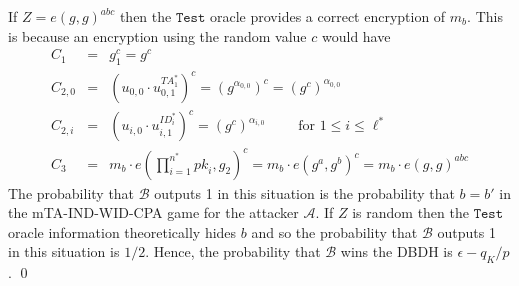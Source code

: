 \documentclass[10pt]{llncs}
\newcommand{\A}{\mathcal{A}}
\newcommand{\B}{\mathcal{B}}
\newcommand{\ID}{\mathit{ID}}
\newcommand{\TA}{\mathit{TA}}
\newcommand{\pk}{\mathit{pk}}
\begin{document}
If $Z=e(g,g)^{abc}$ then the $\texttt{Test}$ oracle provides a correct encryption of $m_{b}$. This is because an encryption using the random value $c$ would have 
\begin{eqnarray*}
C_{1} &=& g_{1}^{c}=g^{c}\\
C_{2,0} &=& (u_{0,0} \cdot u_{0,1}^{\TA^{*}_{1}})^{c} = (g^{\alpha_{0,0}})^{c} = (g^{c})^{\alpha_{0,0}}\\
C_{2,i} &=& (u_{i,0} \cdot u_{i,1}^{\ID^{*}_{i}})^{c} = (g^{c})^{\alpha_{i,0}} \qquad \mbox{ for } 1\leq i\leq \ell^{*}\\
C_{3} &=& m_{b} \cdot e(\prod_{i=1}^{n^{*}} \pk_i,g_{2})^{c}
= m_{b} \cdot e(g^{a},g^{b})^{c} = m_{b} \cdot e(g,g)^{abc}
\end{eqnarray*}
The probability that $\B$ outputs 1 in this situation is the probability that $b=b'$ in the mTA-IND-WID-CPA game for the attacker $\A$. If $Z$ is random then the $\texttt{Test}$ oracle information theoretically hides $b$ and so the probability that $\B$ outputs 1 in this situation is $1/2$. Hence, the probability that $\B$ wins the DBDH is $\epsilon-q_{K}/p$. \qed
\end{document}
